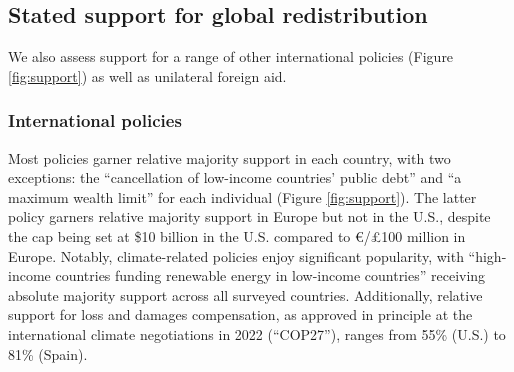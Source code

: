 \begin{bibunit}
\subsection{Stated support for global redistribution}\label{subsec:support_other}


We also assess support for a range of other international policies (Figure \ref{fig:support}) as well as unilateral foreign aid. %


\subsubsection{International policies}\label{subsubsec:support_other_global_policies} %

Most policies garner relative majority support in each country, with two exceptions: the ``cancellation of low-income countries' public debt'' and ``a maximum wealth limit'' for each individual (Figure \ref{fig:support}). %
The latter policy garners relative majority support in Europe but not in the U.S., despite the cap being set at \$10 billion in the U.S. compared to \euro{}/£100 million in Europe. Notably, climate-related policies enjoy significant popularity, with ``high-income countries funding renewable energy in low-income countries'' receiving absolute majority support across all surveyed countries. Additionally, relative support for loss and damages compensation, as approved in principle at the international climate negotiations in 2022 (``COP27''), ranges from 55\% (U.S.) to 81\% (Spain). %



\end{bibunit}
